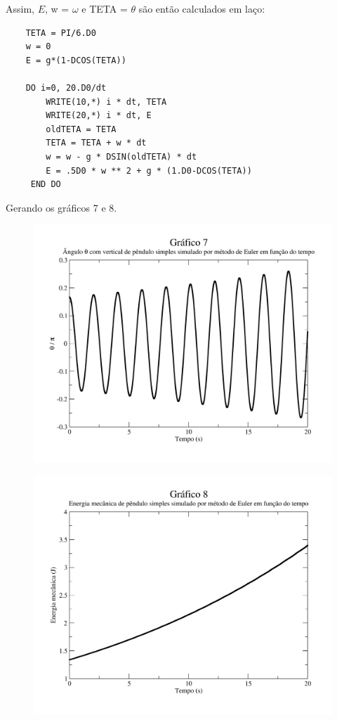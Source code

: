 \documentclass{article}
\begin{document}
Assim, $E$, w = $\omega$ e TETA = $\theta$ são então calculados em laço:

\begin{lstlisting}
    TETA = PI/6.D0
    w = 0
    E = g*(1-DCOS(TETA))

    DO i=0, 20.D0/dt
        WRITE(10,*) i * dt, TETA
        WRITE(20,*) i * dt, E
        oldTETA = TETA
        TETA = TETA + w * dt
        w = w - g * DSIN(oldTETA) * dt
        E = .5D0 * w ** 2 + g * (1.D0-DCOS(TETA))
     END DO
\end{lstlisting}

Gerando os gráficos 7 e 8.

\begin{figure}
  \centering
  \includegraphics[width=.6\textwidth]{graf7.png}
\end{figure}

\begin{figure}
  \centering
  \includegraphics[width=.6\textwidth]{graf8.png}
\end{figure}
\end{document}

